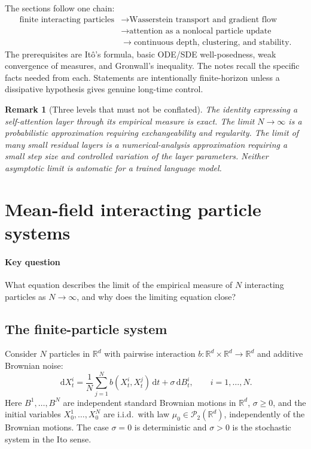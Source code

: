 \documentclass[11pt]{amsart}
\numberwithin{equation}{section}
\theoremstyle{plain}
\newtheorem{remark}[theorem]{Remark}
\newcommand{\R}{\mathbb{R}}
\newcommand{\cP}{\mathcal{P}}
\newcommand{\dd}{\,\mathrm{d}}
\begin{document}
The sections follow one chain:
\[
\begin{split}
  \text{finite interacting particles}
  &\longrightarrow \text{Wasserstein transport and gradient flow}\\
  &\longrightarrow \text{attention as a nonlocal particle update}\\
  &\longrightarrow \text{continuous depth, clustering, and stability}.
\end{split}
\]
The prerequisites are It\^o's formula, basic ODE/SDE well-posedness, weak
convergence of measures, and Gronwall's inequality.  The notes recall the
specific facts needed from each.  Statements are intentionally finite-horizon
unless a dissipative hypothesis gives genuine long-time control.

\begin{remark}[Three levels that must not be conflated]\label{rem:three-levels}
The identity expressing a self-attention layer through its empirical measure is
exact.  The limit $N\to\infty$ is a probabilistic approximation requiring
exchangeability and regularity.  The limit of many small residual layers is a
numerical-analysis approximation requiring a small step size and controlled
variation of the layer parameters.  Neither asymptotic limit is automatic for
a trained language model.
\end{remark}


\section{Mean-field interacting particle systems}\label{sec:ips}
\paragraph{\textbf{Key question}}
What equation describes the limit of the empirical measure of $N$
interacting particles as $N\to\infty$, and why does the limiting equation
close?

\subsection{The finite-particle system}
Consider $N$ particles in $\R^d$ with pairwise interaction
$b:\R^d\times\R^d\to\R^d$ and additive Brownian noise:
\begin{equation}\label{eq:particles}
    \dd X_t^i=\frac1N\sum_{j=1}^N b(X_t^i,X_t^j)\dd t
       +\sigma\dd B_t^i,
    \qquad i=1,\ldots,N.
\end{equation}
Here $B^1,\ldots,B^N$ are independent standard Brownian motions in $\R^d$,
$\sigma\geq0$, and the initial variables $X_0^1,\ldots,X_0^N$ are i.i.d.\ with
law $\mu_0\in\cP_2(\R^d)$, independently of the Brownian motions.  The case
$\sigma=0$ is deterministic and $\sigma>0$ is the stochastic system in the Ito sense.
\end{document}
